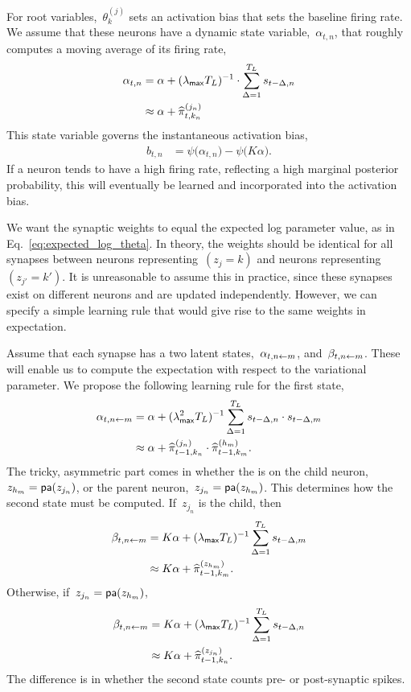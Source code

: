 For root variables,~$\theta_k^{(j)}$ sets an activation bias that sets
the baseline firing rate. We assume that these neurons have a dynamic
state variable,~$\alpha_{t,n}$, that roughly computes a moving average
of its firing rate,
\begin{align}
  \alpha_{t,n} &= \alpha + (\lambda_{\mathsf{max}} T_L)^{-1} \cdot \sum_{\Delta = 1}^{T_L} s_{t-\Delta ,n} \\
  &\approx \alpha + \widehat{\pi}_{t,k_n}^{(j_n)}
\end{align}
This state variable governs the instantaneous activation bias,
\begin{align}
  b_{t,n} &= \psi \big(\alpha_{t,n} \big) - \psi \big( K\alpha \big).
\end{align}
If a neuron tends to have a high firing rate, reflecting a high 
marginal posterior probability, this will eventually be learned and
incorporated into the activation bias.



We want the synaptic weights to equal the expected log parameter
value, as in Eq.~\ref{eq:expected_log_theta}.  In theory, the weights
should be identical for all synapses between neurons
representing~$(z_j=k)$ and neurons representing~$(z_{j'}=k')$.  It is
unreasonable to assume this in practice, since these synapses exist on
different neurons and are updated independently. However, we can
specify a simple learning rule that would give rise to the same
weights in expectation.

Assume that each synapse has a two latent states,~$\alpha_{t, n \leftarrow m}$,
and~$\beta_{t,n \leftarrow m}$. These will enable us to compute
the expectation with respect to the variational parameter.
We propose the following learning rule for the first state,
\begin{align}
  \alpha_{t, n \leftarrow m} &=
  \alpha +
  (\lambda_{\mathsf{max}}^2 T_L)^{-1}  \sum_{\Delta = 1}^{T_L} s_{t-\Delta ,n} \cdot s_{t-\Delta,m} \\
  &\approx \alpha + \widehat{\pi}_{t-1,k_n}^{(j_n)} \cdot \widehat{\pi}_{t-1,k_m}^{(h_m)}. 
\end{align}
The tricky, asymmetric part comes in whether the is on the
child neuron,~$z_{h_m} = \mathsf{pa}(z_{j_n})$, or the parent
neuron,~$z_{j_n}= \mathsf{pa}(z_{h_m})$. This determines how the second
state must be computed. If~$z_{j_n}$ is the child, then
\begin{align}
  \beta_{t,n \leftarrow m} &= K\alpha + (\lambda_{\mathsf{max}} T_L)^{-1} \sum_{\Delta = 1}^{T_L} s_{t -\Delta, m} \\
  &\approx K\alpha + \widehat{\pi}_{t-1,k_m}^{(z_{h_m})}.
\end{align}
Otherwise, if~$z_{j_n} = \mathsf{pa}(z_{h_m})$,
\begin{align}
  \beta_{t,n \leftarrow m} &= K\alpha + (\lambda_{\mathsf{max}} T_L)^{-1} \sum_{\Delta = 1}^{T_L} s_{t -\Delta, n} \\
  &\approx K\alpha + \widehat{\pi}_{t-1,k_n}^{(z_{j_n})}.
\end{align}
The difference is in whether the second state counts pre- or post-synaptic
spikes. 

